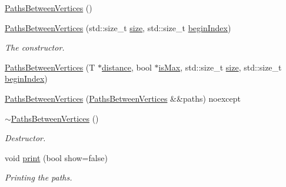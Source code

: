 \begin{DoxyCompactItemize}
\item 
\mbox{\hyperlink{structpbv_1_1_paths_between_vertices_ab9812924cc3075c7501dd17d5a4f4d9c}{Paths\+Between\+Vertices}} ()
\item 
\mbox{\hyperlink{structpbv_1_1_paths_between_vertices_a352d3e86d9e9776ad7c9ec69844d5651}{Paths\+Between\+Vertices}} (std\+::size\+\_\+t \mbox{\hyperlink{structpbv_1_1_paths_between_vertices_a7ffee986b1b7f57a881a883b58bc67f4}{size}}, std\+::size\+\_\+t \mbox{\hyperlink{structpbv_1_1_paths_between_vertices_abf43c3771ed161bb80a73fe39e5cc916}{begin\+Index}})
\begin{DoxyCompactList}\small\item\em The constructor. \end{DoxyCompactList}\item 
\mbox{\hyperlink{structpbv_1_1_paths_between_vertices_a774e36d73a973b9e301e4dbce74b7b29}{Paths\+Between\+Vertices}} (T $\ast$\mbox{\hyperlink{structpbv_1_1_paths_between_vertices_a67aed042aa649d2b6dfeee29d3ec6416}{distance}}, bool $\ast$\mbox{\hyperlink{structpbv_1_1_paths_between_vertices_a8d7391a03771f17ca699f519e64bf2a4}{is\+Max}}, std\+::size\+\_\+t \mbox{\hyperlink{structpbv_1_1_paths_between_vertices_a7ffee986b1b7f57a881a883b58bc67f4}{size}}, std\+::size\+\_\+t \mbox{\hyperlink{structpbv_1_1_paths_between_vertices_abf43c3771ed161bb80a73fe39e5cc916}{begin\+Index}})
\item 
\mbox{\hyperlink{structpbv_1_1_paths_between_vertices_a7b7fadc0fedb587ae9b7deb62ebb6a1c}{Paths\+Between\+Vertices}} (\mbox{\hyperlink{structpbv_1_1_paths_between_vertices}{Paths\+Between\+Vertices}} \&\&paths) noexcept
\item 
\mbox{\hyperlink{structpbv_1_1_paths_between_vertices_a6be9fce23ff701beaf2a44006bd19e5b}{$\sim$\+Paths\+Between\+Vertices}} ()
\begin{DoxyCompactList}\small\item\em Destructor. \end{DoxyCompactList}\item 
void \mbox{\hyperlink{structpbv_1_1_paths_between_vertices_aca6583521b4e35eec9db20c901f200e6}{print}} (bool show=false)
\begin{DoxyCompactList}\small\item\em Printing the paths. \end{DoxyCompactList}\end{DoxyCompactItemize}
